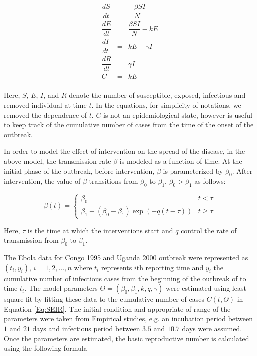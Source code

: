 \documentclass[12pt, journal,onecolumn]{IEEEtran}
\begin{document}
\begin{eqnarray}
\label{Eq:SEIR}
\dfrac{dS}{dt}	&=&	\dfrac{-\beta SI}{N}\nonumber\\
\dfrac{dE}{dt}	&=&	\dfrac{\beta SI}{N}-kE\nonumber\\
\dfrac{dI}{dt}	&=&	kE-\gamma I\nonumber\\
\dfrac{dR}{dt}	&=&	\gamma I\nonumber\\
C	&=&	kE\nonumber\\
 \end{eqnarray}
 
 Here, $S$, $E$, $I$, and $R$ denote the number of susceptible, exposed, infectious and removed individual at time $t$. In the equations, for simplicity of notations, we removed the dependence of $t$. $C$ is not an epidemiological state, however is useful to keep track of the cumulative number of cases from the time of the onset of the outbreak.
 
 In order to model the effect of intervention on the spread of the disease, in the above model, the transmission rate $\beta$ is modeled as a function of time. At the initial phase of the outbreak, before intervention, $\beta$ is parameterized by $\beta_0$. After intervention, the value of $\beta$ transitions from $\beta_0$ to $\beta_1$, $\beta_0>\beta_1$ as follows:
 
 \[
\beta(t)=\begin{cases}
\beta_{0} & t<\tau\\
\beta_{1}+(\beta_{0}-\beta_{1})\exp\left(-q\left(t-\tau\right)\right) & t\ge\tau
\end{cases}
\]

Here, $\tau$ is the time at which the interventions start and $q$ control the rate of transmission from $\beta_0$ to $\beta_1$.

The Ebola data for Congo 1995 and Uganda 2000 outbreak were represented as $(t_i,y_i)$, $i=1,2,\ldots,n$ where $t_i$ represents $i$th reporting time and $y_i$ the cumulative number of infectious cases from the beginning of the outbreak of to time $t_i$.  The model parameters $\Theta=(\beta_0,\beta_1,k,q,\gamma)$ were estimated using least-square fit by fitting these data to the cumulative number of cases $C(t,\Theta)$ in Equation \ref{Eq:SEIR}. The initial condition and appropriate of range of the parameters were taken from Empirical studies, e.g. an incubation period between $1$ and $21$ days and infectious period between $3.5$ and $10.7$ days were assumed. Once the parameters are estimated, the basic reproductive number is calculated using the following formula
\end{document}
